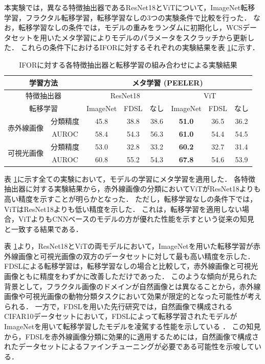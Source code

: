 \documentclass[a4paper,11pt,nomag]{jsreport}
\begin{document}
本実験では，異なる特徴抽出器であるResNet18とViTについて，ImageNet転移学習，フラクタル転移学習，転移学習なしの3つの実験条件で比較を行った．
なお，転移学習なしの条件では，モデルの重みをランダムに初期化し，WCSデータセットを用いたメタ学習によりモデルのパラメータをスクラッチから更新した．
これらの条件下におけるIFORに対するそれぞれの実験結果を表 \ref{tbl:exp1}に示す．
% 
\begin{table}[tbp]
  \centering
  \caption{IFORに対する各特徴抽出器と転移学習の組み合わせによる実験結果}
  \label{tbl:exp1}

  \begin{tabular}{cc||c|c|c|c|c|c}
      \hline
      \multicolumn{2}{c||}{学習方法}       & \multicolumn{6}{c}{メタ学習 (PEELER)}                        \\ \hline
      \multicolumn{2}{c||}{特徴抽出器}     & \multicolumn{3}{c|}{ResNet18} & \multicolumn{3}{c}{ViT}     \\ \hline
      \multicolumn{2}{c||}{転移学習}       &  ImageNet  &  FDSL  &  なし   &   ImageNet    & FDSL & なし  \\ \hline\hline
      \multirow{2}{*}{赤外線画像} & 分類精度 &    45.8    &  38.8  &  38.6  & \textbf{51.0} & 36.5 & 36.2 \\
                                & AUROC   &    58.4    &  54.3  &  56.3  & \textbf{61.0} & 54.4 & 54.5 \\ \hline
      \multirow{2}{*}{可視光画像} & 分類精度 &    53.0    &  32.8  &  33.2  & \textbf{60.2} & 32.7 & 31.4 \\
                                & AUROC   &    60.8    &  55.2  &  54.3  & \textbf{67.8} & 54.6 & 53.9 \\ \hline
  \end{tabular}
\end{table}
% 
表 \ref{tbl:exp1}に示す全ての実験において，モデルの学習にメタ学習を適用した．
各特徴抽出器に対する実験結果から，赤外線画像の分類においてViTがResNet18よりも高い精度を示すことが明らかとなった．
ただし，転移学習なしの条件下では，ViTはResNet18よりも低い精度を示した．
これは，転移学習を適用しない場合，ViTよりもCNNベースのモデルの方が優れた性能を示すという従来の知見 \cite{vit}と一致する結果である．

表 \ref{tbl:exp1}より，ResNet18とViTの両モデルにおいて，ImageNetを用いた転移学習が赤外線画像と可視光画像の双方のデータセットに対して最も高い精度を示した．
FDSLによる転移学習は，転移学習なしの場合と比較して，赤外線画像と可視光画像ともに精度をわずかに改善しただけであった．
このような傾向が見られた背景として，フラクタル画像のドメインが自然画像とは異なることから，赤外線画像や可視光画像の動物分類タスクにおいて効果が限定的となった可能性が考えられる．
一方で，FDSLを用いた先行研究では，自然画像で構成されるCIFAR10データセットにおいて，FDSLによって転移学習されたモデルがImageNetを用いて転移学習したモデルを凌駕する性能を示している \cite{fdsl}．
この知見から，FDSLを赤外線画像分類に効果的に適用するためには，自然画像で構成されたデータセットによるファインチューニングが必要である可能性を示唆している．
\end{document}
